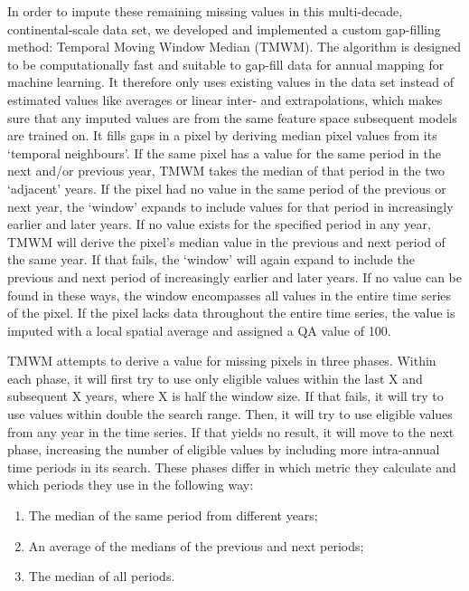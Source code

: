 In order to impute these remaining missing values in this multi-decade, continental-scale data set, we developed and implemented a custom gap-filling method: Temporal Moving Window Median (TMWM). The algorithm is designed to be computationally fast and suitable to gap-fill data for annual mapping for machine learning. It therefore only uses existing values in the data set instead of estimated values like averages or linear inter- and extrapolations, which makes sure that any imputed values are from the same feature space subsequent models are trained on. It fills gaps in a pixel by deriving median pixel values from its `temporal neighbours'. If the same pixel has a value for the same period in the next and/or previous year, TMWM takes the median of that period in the two `adjacent' years. If the pixel had no value in the same period of the previous or next year, the `window' expands to include values for that period in increasingly earlier and later years. If no value exists for the specified period in any year, TMWM will derive the pixel's median value in the previous and next period of the same year. If that fails, the `window' will again expand to include the previous and next period of increasingly earlier and later years. If no value can be found in these ways, the window encompasses all values in the entire time series of the pixel. If the pixel lacks data throughout the entire time series, the value is imputed with a local spatial average and assigned a QA value of 100.

TMWM attempts to derive a value for missing pixels in three phases. Within each phase, it will first try to use only eligible values within the last X and subsequent X years, where X is half the window size. If that fails, it will try to use values within double the search range. Then, it will try to use eligible values from any year in the time series. If that yields no result, it will move to the next phase, increasing the number of eligible values by including more intra-annual time periods in its search. These phases differ in which metric they calculate and which periods they use in the following way:

\begin{enumerate}[noitemsep]
\item The median of the same period from different years;
\item An average of the medians of the previous and next periods;
\item The median of all periods.
\end{enumerate}

